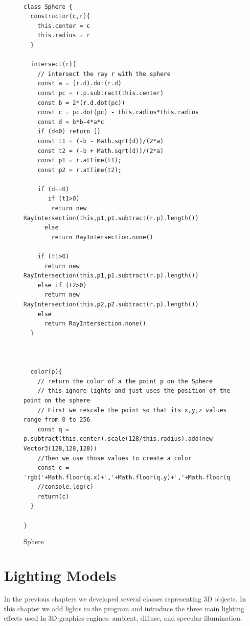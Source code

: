 \documentclass{book}
\begin{document}
\begin{figure}
\begin{verbatim}

class Sphere {
  constructor(c,r){
    this.center = c
    this.radius = r
  }

  intersect(r){
    // intersect the ray r with the sphere
    const a = (r.d).dot(r.d)
    const pc = r.p.subtract(this.center)
    const b = 2*(r.d.dot(pc))
    const c = pc.dot(pc) - this.radius*this.radius
    const d = b*b-4*a*c
    if (d<0) return []
    const t1 = (-b - Math.sqrt(d))/(2*a)
    const t2 = (-b + Math.sqrt(d))/(2*a)
    const p1 = r.atTime(t1);
    const p2 = r.atTime(t2);

    if (d==0)
       if (t1>0)
        return new RayIntersection(this,p1,p1.subtract(r.p).length())
      else
        return RayIntersection.none()

    if (t1>0)
      return new RayIntersection(this,p1,p1.subtract(r.p).length())
    else if (t2>0)
      return new RayIntersection(this,p2,p2.subtract(r.p).length())
    else
      return RayIntersection.none()
  }



  color(p){
    // return the color of a the point p on the Sphere
    // this ignore lights and just uses the position of the point on the sphere
    // First we rescale the point so that its x,y,z values range from 0 to 256
    const q = p.subtract(this.center).scale(128/this.radius).add(new Vector3(128,128,128))
    //Then we use those values to create a color
    const c =  'rgb('+Math.floor(q.x)+','+Math.floor(q.y)+','+Math.floor(q.z)+')'
    //console.log(c)
    return(c)
  }

}

\end{verbatim}
\caption{Sphere \label{fig:SphereClass}}
\end{figure}










\chapter{Lighting Models}
In the previous chapters we developed several classes representing 3D objects.
In this chapter we add lights to the program and introduce the three main lighting
effects used in 3D graphics engines: ambient, diffuse, and specular illumination.
\end{document}
